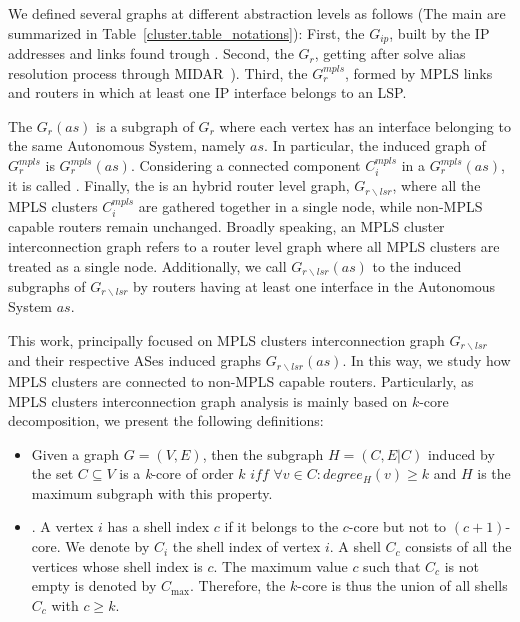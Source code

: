 We defined several graphs at different abstraction levels as follows (The main are
summarized in Table~\ref{cluster.table_notations}): First, the  $G_{ip}$, built
by the IP addresses and links found trough
\traceroute. Second, the  $G_{r}$, getting after solve alias resolution process
through MIDAR~\cite{Keys13}). Third, the  $G^{mpls}_{r}$, formed by MPLS links and routers in which at least one IP interface belongs
to an LSP.

The  $G_{r}(as)$ is a subgraph of $G_{r}$ where 
each vertex  has an interface belonging to the same Autonomous System, namely $as$. 
In particular, the induced graph of $G_r^{mpls}$ is
$G^{mpls}_{r}(as)$.  Considering a connected component $C^{mpls}_{i}$ in a $G^{mpls}_{r}(as)$, it is called  . Finally, the  is an hybrid router level graph,  $G_{r\backslash lsr}$,
where all the MPLS clusters $C^{mpls}_{i}$ are gathered together in a single
node, while non-MPLS capable routers remain unchanged.
Broadly speaking, an MPLS cluster interconnection graph refers to a router level
graph where all MPLS clusters are treated as a single node. Additionally,
we call $G_{r\backslash lsr}(as)$ to the induced
subgraphs of $G_{r\backslash lsr}$ by routers having at least one interface in
the Autonomous System $as$.

This work,  principally focused on MPLS
clusters interconnection graph $G_{r\backslash lsr}$ and their respective ASes induced graphs $G_{r\backslash lsr}(as)$. In this way, we study how MPLS clusters are connected 
to non-MPLS capable routers. Particularly, as MPLS clusters interconnection graph analysis is mainly based on $k$-core decomposition,
we  present the following definitions:
\begin{itemize}
  \item{} Given a graph $G=(V,E)$, then the
  subgraph $H=(C,E|C)$ induced by the set $ C\subseteq V$ is a \textit{k}-core
  of order $k$ $iff$ $\forall v \in C: degree_{H}(v)\geq k$ and $H$ is the
  maximum subgraph with this property.
      
  \item{}. A vertex $i$ has a shell index $c$ if it
  belongs to the $c$-core but not to $(c+1)$-core. We denote by $C_i$ the shell
  index of vertex $i$. A shell $C_c$ consists of all the vertices whose shell
  index is $c$. The maximum value $c$ such that $C_c$ is not empty is denoted by
  $C_{\max}$.  Therefore, the $k$-core is thus the union of all shells $C_c$ with
  $c \geq k$.
\end{itemize}

